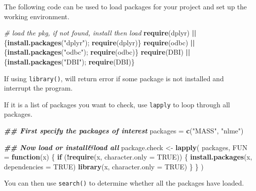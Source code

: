 \documentclass[
  a4paper,
  twoside,
  openright]{book}
\newenvironment{Shaded}{\begin{snugshade}}{\end{snugshade}}
\newcommand{\AttributeTok}[1]{\textcolor[rgb]{0.13,0.29,0.53}{#1}}
\newcommand{\CommentTok}[1]{\textcolor[rgb]{0.56,0.35,0.01}{\textit{#1}}}
\newcommand{\ConstantTok}[1]{\textcolor[rgb]{0.56,0.35,0.01}{#1}}
\newcommand{\ControlFlowTok}[1]{\textcolor[rgb]{0.13,0.29,0.53}{\textbf{#1}}}
\newcommand{\DocumentationTok}[1]{\textcolor[rgb]{0.56,0.35,0.01}{\textbf{\textit{#1}}}}
\newcommand{\FunctionTok}[1]{\textcolor[rgb]{0.13,0.29,0.53}{\textbf{#1}}}
\newcommand{\NormalTok}[1]{#1}
\newcommand{\OtherTok}[1]{\textcolor[rgb]{0.56,0.35,0.01}{#1}}
\newcommand{\SpecialCharTok}[1]{\textcolor[rgb]{0.81,0.36,0.00}{\textbf{#1}}}
\newcommand{\StringTok}[1]{\textcolor[rgb]{0.31,0.60,0.02}{#1}}
\theoremstyle{definition}
\theoremstyle{definition}
\theoremstyle{definition}
\theoremstyle{definition}
\theoremstyle{remark}
\begin{document}
The following code can be used to load packages for your project and set up the working environment.

\begin{Shaded}
\begin{Highlighting}[]
\CommentTok{\# load the pkg, if not found, install then load}
\FunctionTok{require}\NormalTok{(dplyr) }\SpecialCharTok{||}\NormalTok{ \{}\FunctionTok{install.packages}\NormalTok{(}\StringTok{"dplyr"}\NormalTok{); }\FunctionTok{require}\NormalTok{(dplyr)\}}
\FunctionTok{require}\NormalTok{(odbc) }\SpecialCharTok{||}\NormalTok{ \{}\FunctionTok{install.packages}\NormalTok{(}\StringTok{"odbc"}\NormalTok{); }\FunctionTok{require}\NormalTok{(odbc)\}}
\FunctionTok{require}\NormalTok{(DBI) }\SpecialCharTok{||}\NormalTok{ \{}\FunctionTok{install.packages}\NormalTok{(}\StringTok{"DBI"}\NormalTok{); }\FunctionTok{require}\NormalTok{(DBI)\}}
\end{Highlighting}
\end{Shaded}

If using \texttt{library()}, will return error if some package is not installed and interrupt the program.

If it is a list of packages you want to check, use \texttt{lapply} to loop through all packages.

\begin{Shaded}
\begin{Highlighting}[]
\DocumentationTok{\#\# First specify the packages of interest}
\NormalTok{packages }\OtherTok{=} \FunctionTok{c}\NormalTok{(}\StringTok{"MASS"}\NormalTok{, }\StringTok{"nlme"}\NormalTok{)}

\DocumentationTok{\#\# Now load or install\&load all}
\NormalTok{package.check }\OtherTok{\textless{}{-}} \FunctionTok{lapply}\NormalTok{(}
\NormalTok{  packages,}
  \AttributeTok{FUN =} \ControlFlowTok{function}\NormalTok{(x) \{}
    \ControlFlowTok{if}\NormalTok{ (}\SpecialCharTok{!}\FunctionTok{require}\NormalTok{(x, }\AttributeTok{character.only =} \ConstantTok{TRUE}\NormalTok{)) \{}
      \FunctionTok{install.packages}\NormalTok{(x, }\AttributeTok{dependencies =} \ConstantTok{TRUE}\NormalTok{)}
      \FunctionTok{library}\NormalTok{(x, }\AttributeTok{character.only =} \ConstantTok{TRUE}\NormalTok{)}
\NormalTok{    \}}
\NormalTok{  \}}
\NormalTok{)}
\end{Highlighting}
\end{Shaded}

You can then use \texttt{search()} to determine whether all the packages have loaded.
\end{document}
